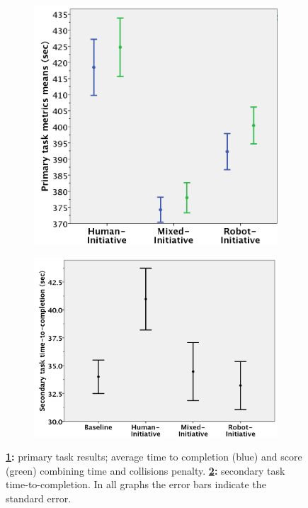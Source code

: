 \documentclass[a4paper,12pt,oneside,openright]{bhamthesis}
\begin{document}
	\begin{figure}
		\centering
		\begin{subfigure}[b]{0.47\textwidth}
			\centering
			\includegraphics[width=\textwidth]{chapter5_fig/exp2_2_primary_metrics.png}
			\caption{}
			\label{subfig:primary_time_score_exp2_2}
		\end{subfigure}
		\hfill
		\begin{subfigure}[b]{0.5\textwidth}
			\centering
			\includegraphics[width=\textwidth]{chapter5_fig/exp2_2_secondary_time.png}
			\caption{}
			\label{subfig:secondarytime_exp2_2}
		\end{subfigure}
		\hfill
		\caption{\textbf{\ref{subfig:primary_time_score_exp2_2}:} primary task results; average time to completion (blue) and score (green) combining time and collisions penalty. \textbf{\ref{subfig:secondarytime_exp2_2}:} secondary task time-to-completion. In all graphs the error bars indicate the standard error.}
		\label{fig:primary_secondary_exp2_2}
	\end{figure}
\end{document}
